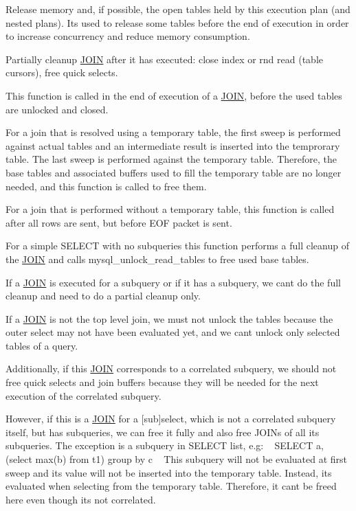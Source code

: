 Release memory and, if possible, the open tables held by this execution plan (and nested plans). It\textquotesingle{}s used to release some tables before the end of execution in order to increase concurrency and reduce memory consumption.

Partially cleanup \mbox{\hyperlink{classJOIN}{J\+O\+IN}} after it has executed\+: close index or rnd read (table cursors), free quick selects.

This function is called in the end of execution of a \mbox{\hyperlink{classJOIN}{J\+O\+IN}}, before the used tables are unlocked and closed.

For a join that is resolved using a temporary table, the first sweep is performed against actual tables and an intermediate result is inserted into the temprorary table. The last sweep is performed against the temporary table. Therefore, the base tables and associated buffers used to fill the temporary table are no longer needed, and this function is called to free them.

For a join that is performed without a temporary table, this function is called after all rows are sent, but before E\+OF packet is sent.

For a simple S\+E\+L\+E\+CT with no subqueries this function performs a full cleanup of the \mbox{\hyperlink{classJOIN}{J\+O\+IN}} and calls mysql\+\_\+unlock\+\_\+read\+\_\+tables to free used base tables.

If a \mbox{\hyperlink{classJOIN}{J\+O\+IN}} is executed for a subquery or if it has a subquery, we can\textquotesingle{}t do the full cleanup and need to do a partial cleanup only.
\begin{DoxyItemize}
\item If a \mbox{\hyperlink{classJOIN}{J\+O\+IN}} is not the top level join, we must not unlock the tables because the outer select may not have been evaluated yet, and we can\textquotesingle{}t unlock only selected tables of a query.
\item Additionally, if this \mbox{\hyperlink{classJOIN}{J\+O\+IN}} corresponds to a correlated subquery, we should not free quick selects and join buffers because they will be needed for the next execution of the correlated subquery.
\item However, if this is a \mbox{\hyperlink{classJOIN}{J\+O\+IN}} for a \mbox{[}sub\mbox{]}select, which is not a correlated subquery itself, but has subqueries, we can free it fully and also free J\+O\+I\+Ns of all its subqueries. The exception is a subquery in S\+E\+L\+E\+CT list, e.\+g\+: ~\newline
 S\+E\+L\+E\+CT a, (select max(b) from t1) group by c ~\newline
 This subquery will not be evaluated at first sweep and its value will not be inserted into the temporary table. Instead, it\textquotesingle{}s evaluated when selecting from the temporary table. Therefore, it can\textquotesingle{}t be freed here even though it\textquotesingle{}s not correlated.
\end{DoxyItemize}

